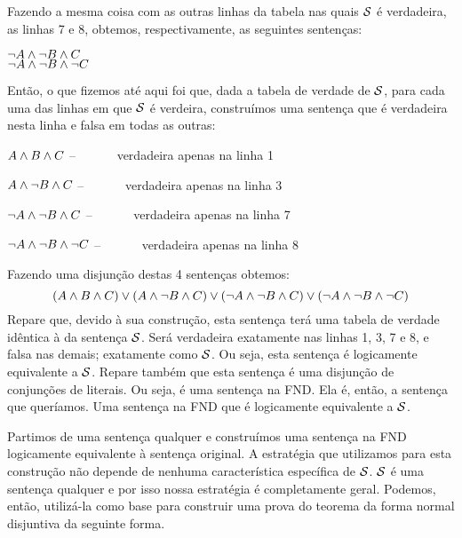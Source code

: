 Fazendo a mesma coisa com as outras linhas da tabela nas quais $\mathcal{S}$ é verdadeira, as linhas 7 e 8, obtemos, respectivamente, as seguintes sentenças:
\begin{center}
		$\neg A \wedge \neg B \wedge C$ \\
		$\neg A \wedge \neg B \wedge \neg C$
\end{center}
Então, o que fizemos até aqui foi que, dada a tabela de verdade de $\mathcal{S}$, para cada uma das linhas em que $\mathcal{S}$ é verdeira, construímos uma sentença que é verdadeira nesta linha e falsa em todas as outras:
	\begin{earg}
		\item[]   $A \wedge B \wedge C$ \hfill  -- \ \ \ \ \ \ verdadeira apenas na linha 1
		\item[]  $A \wedge \neg B \wedge C$ \hfill  -- \ \ \ \ \ \  verdadeira apenas na linha 3
		\item[]  $\neg A \wedge \neg B \wedge C$ \hfill  -- \ \ \ \ \ \  verdadeira apenas na linha 7
		\item[]  $\neg A \wedge \neg B \wedge \neg C$ \hfill  -- \ \ \ \ \ \  verdadeira apenas na linha 8
	\end{earg}
Fazendo uma disjunção destas 4 sentenças obtemos:
$$(A \wedge B \wedge C) \vee (A \wedge \neg B \wedge C) \vee (\neg A \wedge \neg B \wedge C) \vee (\neg A \wedge \neg B \wedge \neg C)$$
Repare que, devido à sua construção, esta sentença terá uma tabela de verdade idêntica à da sentença $\mathcal{S}$. Será verdadeira exatamente nas linhas 1, 3, 7 e 8, e falsa nas demais; exatamente como  $\mathcal{S}$.
Ou seja, esta sentença é logicamente equivalente a $\mathcal{S}$.
Repare também que esta sentença é uma disjunção de conjunções de literais. Ou seja, é uma sentença na FND.
Ela é, então, a sentença que queríamos.
Uma sentença na FND que é logicamente equivalente a $\mathcal{S}$.

Partimos de uma sentença qualquer e construímos uma sentença na FND logicamente equivalente à sentença original.
A estratégia que utilizamos para esta construção não depende de nenhuma característica específica de $\mathcal{S}$.
$\mathcal{S}$ é uma sentença qualquer e por isso nossa estratégia é completamente geral.
Podemos, então, utilizá-la como base para construir uma prova do teorema da forma normal disjuntiva da seguinte forma.


